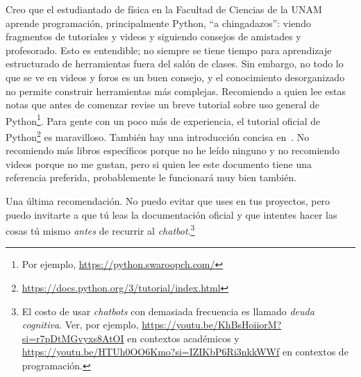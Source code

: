 Creo que el estudiantado de física en la Facultad de Ciencias de la UNAM aprende programación,
principalmente Python, \enquote{a chingadazos}: viendo fragmentos de
tutoriales y videos y siguiendo consejos de amistades y profesorado.
Esto es entendible; no siempre se tiene tiempo para aprendizaje estructurado de herramientas
fuera del salón de clases.
Sin embargo, no todo lo que se ve en videos y foros es un buen consejo, y el
conocimiento desorganizado no permite construir herramientas más complejas.
Recomiendo a quien lee estas notas que antes de comenzar revise un breve tutorial
sobre uso general de Python\footnote{
  Por ejemplo, \url{https://python.swaroopch.com/}
  }.
Para gente con un poco más de experiencia, el tutorial oficial de Python\footnote{
  \url{https://docs.python.org/3/tutorial/index.html}
} es maravilloso.
También hay una introducción concisa en~\autocite{EspejelMorales2019}.
No recomiendo más libros específicos porque no he leído ninguno y no recomiendo videos
porque no me gustan, pero si quien lee este documento tiene una referencia preferida,
probablemente le funcionará muy bien también.

Una última recomendación. No puedo evitar que uses 
en tus proyectos, pero puedo invitarte a que tú leas la documentación oficial y que
intentes hacer las cosas tú mismo \emph{antes} de recurrir al \textit{chatbot}.\footnote{
  El costo de usar \textit{chatbots} con demasiada frecuencia es llamado
  \emph{deuda cognitiva}. Ver, por ejemplo,
  \url{https://youtu.be/KhBsHoiiorM?si=r7pDtMGvyxs8AtOI} en contextos académicos y
  \url{https://youtu.be/HTUh0OO6Kmo?si=IZIKbP6Ri3nkkWWf} en contextos de programación.
}
